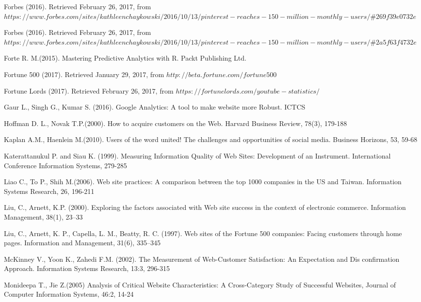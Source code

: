 \documentclass{book}
\begin{document}
\begin{thebibliography}{widest-label}
Forbes (2016). Retrieved February 26, 2017, from $https://www.forbes.com/sites/kathleenchaykowski/2016/10/13/pinterest-reaches-150-million-monthly-users/$\#$269f39e0732e$

Forbes (2016). Retrieved February 26, 2017, from $https://www.forbes.com/sites/kathleenchaykowski/2016/10/13/pinterest-reaches-150-million-monthly-users/$\#$2a5f63f4732e$

Forte R. M.(2015). Mastering Predictive Analytics with R. Packt Publishing Ltd.

Fortune 500 (2017). Retrieved January 29, 2017, from $http://beta.fortune.com/fortune500$

Fortune Lords (2017). Retrieved February 26, 2017, from $https://fortunelords.com/youtube-statistics/$

Gaur L., Singh G., Kumar S. (2016). Google Analytics: A tool to make website more Robust. ICTCS

Hoffman D. L., Novak T.P.(2000). How to acquire customers on the Web. Harvard Business Review, 78(3), 179-188

Kaplan A.M., Haenlein M.(2010). Users of the word united! The challenges and opportunities of social media. Business Horizons, 53, 59-68

Katerattanukul P. and Siau K. (1999). Measuring Information Quality of Web Sites: Development of an Instrument. 
International Conference Information Systems, 279-285

 Liao C., To P., Shih M.(2006). Web site practices: A comparison between the top 1000 companies in the US and Taiwan. Information Systems Research, 26, 196-211

 Liu, C., Arnett, K.P. (2000). Exploring the factors associated with Web site success in the context
of electronic commerce. Information Management, 38(1), 23–33

 Liu, C., Arnett, K. P., Capella, L. M., Beatty, R. C. (1997). Web sites of the Fortune 500 companies: Facing customers through home pages. Information and Management, 31(6), 335–345

McKinney V., Yoon K., Zahedi F.M. (2002). The
Measurement of Web-Customer Satisfaction: An Expectation and Dis confirmation Approach. Information Systems Research, 13:3, 296-315

 Monideepa T., Jie Z.(2005) Analysis of Critical Website Characteristics: A Cross-Category Study of Successful Websites, Journal of Computer Information Systems, 46:2, 14-24


\end{thebibliography}
\end{document}

